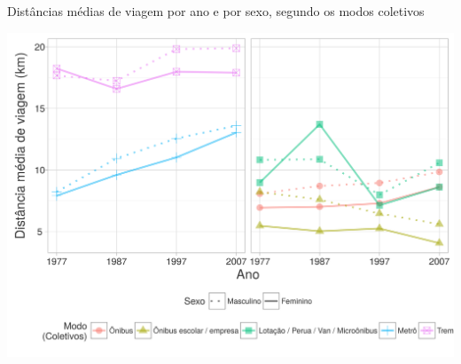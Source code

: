 \begin{grafico}[htb]%
    \caption{\label{graf:distancia-coletivo}Distâncias médias de viagem por ano e por sexo, segundo os modos coletivos}%
    \begin{center}%
        \includegraphics[width=1\textwidth]{./imagens/distancia-coletivo.png}%
    \end{center}%
\end{grafico}%

\newpage

